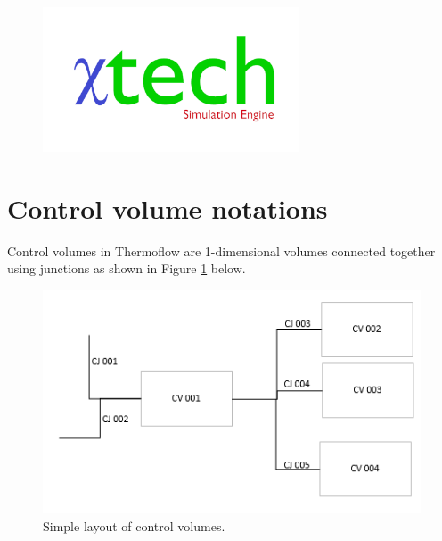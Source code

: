 \documentclass[11pt,letterpaper,titlepage]{article}
\begin{document}
\begin{titlepage}
\begin{center}
\begin{minipage}[c]{0.45\textwidth}
\begin{figure}[H]
				\includegraphics[width=3in]{Logo2_Medium.png}
			\end{figure}
		\end{minipage}
	\end{center}
	\vspace{2cm}
\end{titlepage}


\pagestyle{fancy}
\cfoot{}
\lfoot{\truncate{14cm}{\NSCDOCTITLE}}
\rhead{}
\chead{\currentname}
\lhead{}
\renewcommand{\footrulewidth}{0.4pt}
\tableofcontents
{}

\listoffigures
\listoftables
{}


\newpage
{}
\section{Control volume notations}
Control volumes in Thermoflow are 1-dimensional volumes connected together using junctions as shown in Figure \ref{figure:ZZZ_ControlVolume} below.

	\begin{center}
		\begin{minipage}[c]{0.7\textwidth}
	
			\begin{figure}[H]
			
				\includegraphics{ZZZ_ControlVolume.png}
				\caption{Simple layout of control volumes.}
				\label{figure:ZZZ_ControlVolume}
			\end{figure}
		\end{minipage}
	\end{center}
\end{document}
